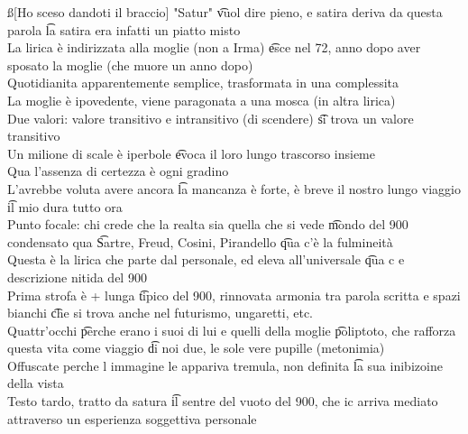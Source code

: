 \documentclass[12pt]{article}
\begin{document}
\ss[Ho sceso dandoti il braccio]
"Satur" \t vuol dire pieno, e satira deriva da questa parola \t la satira era infatti un piatto misto \\
La lirica è indirizzata alla moglie (non a Irma) \t esce nel 72, anno dopo aver sposato la moglie (che muore un anno dopo) \\
Quotidianita apparentemente semplice, trasformata in una complessita \\
La moglie è ipovedente, viene paragonata a una mosca (in altra lirica) \\
Due valori: valore transitivo e intransitivo (di scendere) \t si trova un valore transitivo \\
Un milione di scale è iperbole \t evoca il loro lungo trascorso insieme \\
Qua l'assenza di certezza è ogni gradino \\
L'avrebbe voluta avere ancora \t la mancanza è forte, è breve il nostro lungo viaggio \t il mio dura tutto ora \\
Punto focale: chi crede che la realta sia quella che si vede \t mondo del 900 condensato qua \t Sartre, Freud, Cosini, Pirandello \t qua c'è la fulmineità \\
Questa è la lirica che parte dal personale, ed eleva all'universale \t qua c e descrizione nitida del 900 \\
Prima strofa è + lunga \t tipico del 900, rinnovata armonia tra parola scritta e spazi bianchi \t che si trova anche nel futurismo, ungaretti, etc. \\
Quattr'occhi \t perche erano i suoi di lui e quelli della moglie \t poliptoto, che rafforza questa vita come viaggio \t di noi due, le sole vere pupille (metonimia) \\
Offuscate perche l immagine le appariva tremula, non definita \t la sua inibizoine della vista \\
Testo tardo, tratto da satura \t il sentre del vuoto del 900, che ic arriva mediato attraverso un esperienza soggettiva personale 
\end{document}
